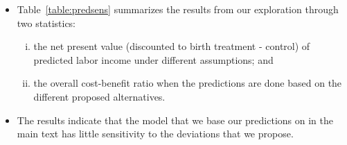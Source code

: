 \documentclass[static]{JJH-Beamer}
\begin{document}
\begin{frame}
 \addtocounter{framenumber}{-1}

\begin{itemize}
\item Table~\ref{table:predsens} summarizes the results from our exploration through two statistics:
    \begin{enumerate}[(i)]
    \item the net present value (discounted to birth treatment - control) of predicted labor income under different assumptions; and
    \item the overall cost-benefit ratio when the predictions are done based on the different proposed alternatives.
    \end{enumerate}
\item The results indicate that the model that we base our predictions on in the main text has little sensitivity to the deviations that we propose.
\end{itemize}

\end{frame}
\end{document}
